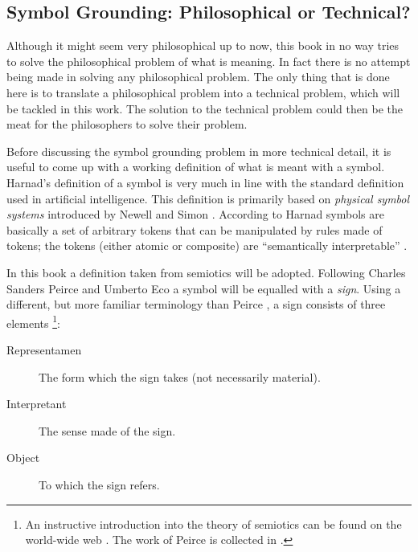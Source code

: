 \subsection{Symbol Grounding: Philosophical or Technical?}

\label{s:intro:semiotic}

Although it might seem very philosophical up to now, this book in no way tries to solve the philosophical problem of what is meaning. In fact there is no attempt being made in solving any philosophical problem. The only thing that is done here is to translate a philosophical problem into a technical problem, which will be tackled in this work. The solution to the technical problem could then be the meat for the philosophers to solve their problem.


Before discussing the symbol grounding problem in more technical detail, it is useful to come up with a working definition of what is meant with a symbol. Harnad's definition of a symbol is very much in line with the standard definition used in artificial intelligence. This definition is primarily based on {\em physical symbol systems} introduced by Newell and Simon \citep{newell:1980,newell:1990}. According to Harnad symbols are basically a set of arbitrary tokens that can be manipulated by rules made of tokens; the tokens (either atomic or composite) are ``semantically interpretable'' \citep{harnad:1990}.


In this book a definition taken from semiotics will be adopted. Following Charles Sanders Peirce and Umberto Eco \citep{eco:1976,eco:1986} a symbol will be equalled with a {\em sign}. Using a different, but more familiar terminology than Peirce  \citep{noth:1990}, a sign consists of three elements \citep{chandler:1994}\footnote{An instructive introduction into the theory of semiotics can be found on the world-wide web \citep{chandler:1994}. The work of Peirce is collected in \citep{peirce:1931}.}:

\begin{description}
\item[Representamen] The form which the sign takes (not necessarily material).
\item[Interpretant] The sense made of the sign.
\item[Object] To which the sign refers. 
\end{description}

